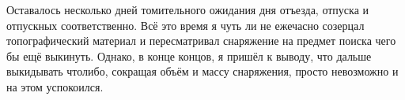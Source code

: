 Оставалось несколько дней томительного ожидания дня отъезда, отпуска и отпускных соответственно. Всё это время я чуть ли не ежечасно созерцал топографический материал и пересматривал снаряжение на предмет поиска чего бы ещё выкинуть. Однако, в конце концов, я пришёл к выводу, что дальше выкидывать что\sdash либо, сокращая объём и массу снаряжения, просто невозможно и на этом успокоился.

\begin{center}
\end{center}